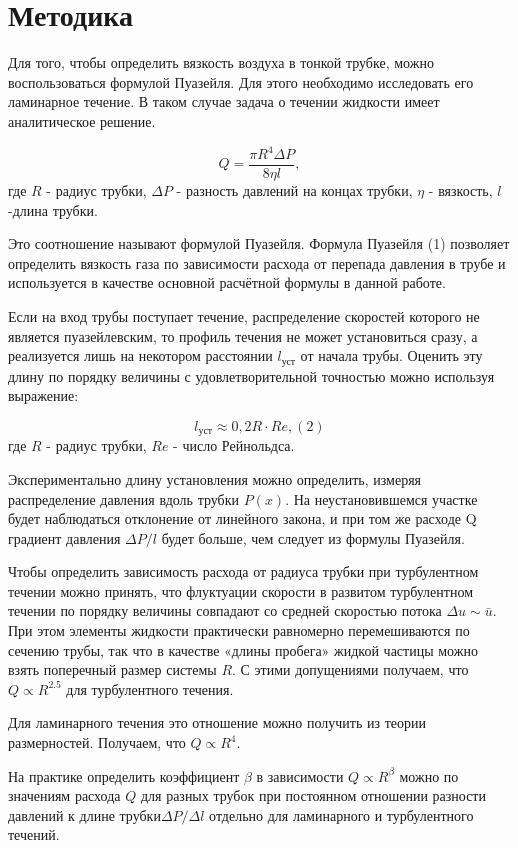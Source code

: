 \chapter{Методика}
\label{ch:methods}

Для того, чтобы определить вязкость воздуха в тонкой трубке, можно воспользоваться формулой Пуазейля. Для этого необходимо исследовать его ламинарное течение. В таком случае задача о течении жидкости имеет аналитическое решение.

\begin{equation}
Q  = \frac{\pi R^4 \Delta P}{8 \eta l}, 
\end{equation}
где $R$ - радиус трубки, $\Delta P$ - разность давлений на концах трубки, $\eta$ - вязкость, $l$ -длина трубки.

Это соотношение называют формулой Пуазейля. Формула Пуазейля (1) позволяет определить вязкость газа по зависимости расхода от перепада давления в трубе и используется в качестве основной расчётной формулы в данной работе. %

Если на вход трубы поступает течение, распределение скоростей которого не является пуазейлевским, то профиль течения не может установиться сразу, а реализуется лишь на некотором расстоянии $l_\text{уст}$ от начала трубы. Оценить эту длину по порядку величины с удовлетворительной точностью можно используя выражение:

\begin{equation}
    l_\text{уст} \approx 0,2R \cdot Re, (2)
\end{equation}
где $R$ - радиус трубки, $Re$ - число Рейнольдса.

Экспериментально длину установления можно определить, измеряя распределение давления вдоль трубки $P(x)$. На неустановившемся участке будет наблюдаться отклонение от линейного закона, и при том же расходе Q градиент давления $\Delta P/l$ будет больше, чем следует из формулы Пуазейля.

Чтобы определить зависимость расхода от радиуса трубки при турбулентном течении можно принять, что флуктуации скорости в развитом турбулентном течении по порядку величины совпадают со средней скоростью потока $\Delta u \sim  \bar{u}$. При этом элементы жидкости практически равномерно перемешиваются по сечению трубы, так что в качестве «длины пробега» жидкой частицы можно взять поперечный размер системы $R$. С этими допущениями получаем, что $Q \propto R^{2.5}$ для турбулентного течения.

Для ламинарного течения это отношение можно получить из теории размерностей. Получаем, что $Q \propto R^4$.

На практике определить коэффициент $\beta$ в зависимости $Q \propto R^\beta$ можно по значениям расхода $Q$ для разных трубок при постоянном отношении разности давлений к длине трубки$\Delta P/\Delta l$ отдельно для ламинарного и турбулентного течений.